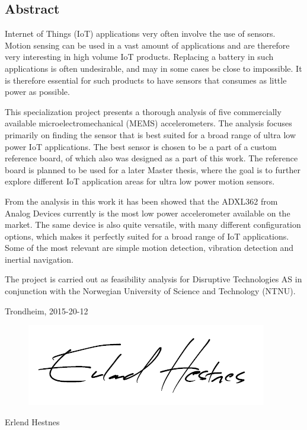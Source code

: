 \begin{center}
\section*{Abstract}
\end{center}

Internet of Things (IoT) applications very often involve the use of sensors. Motion sensing can be used in a vast amount of applications and are therefore very interesting in high volume IoT products. Replacing a battery in such applications is often undesirable, and may in some cases be close to impossible. It is therefore essential for such products to have sensors that consumes as little power as possible. 

This specialization project presents a thorough analysis of five commercially available microelectromechanical (MEMS) accelerometers. The analysis focuses primarily on finding the sensor that is best suited for a broad range of ultra low power IoT applications. The best sensor is chosen to be a part of a custom reference board, of which also was designed as a part of this work. The reference board is planned to be used for a later Master thesis, where the goal is to further explore different IoT application areas for ultra low power motion sensors.

From the analysis in this work it has been showed that the ADXL362 from Analog Devices currently is the most low power accelerometer available on the market. The same device is also quite versatile, with many different configuration options, which makes it perfectly suited for a broad range of IoT applications. Some of the most relevant are simple motion detection, vibration detection and inertial navigation.  

The project is carried out as feasibility analysis for Disruptive Technologies AS in conjunction with the Norwegian University of Science and Technology (NTNU).

\begin{center}
Trondheim, 2015-20-12\\[1pc]
\begin{figure}[h]
\centering
\includegraphics[scale=0.5]{fig/underskrift.png}
\label{fig:underskrift}
\end{figure}
Erlend Hestnes
\end{center}